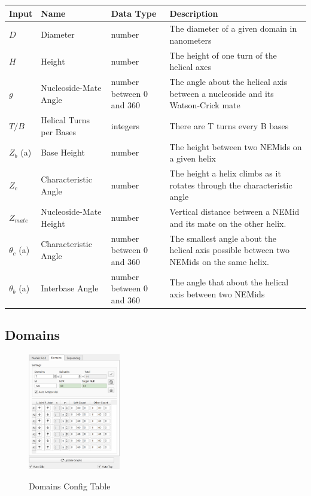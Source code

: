\documentclass[titlepage]{article}
\begin{document}
	\begin{tabular}{|p{.5in}|p{1in}|p{.7in}|p{1.5in}|}
		\label{tab:setting-descriptions}
		\centering
		Input & Name & Data Type & Description \\
		\hline
		$D$ & Diameter & number & The diameter of a given domain in nanometers \\ \hline
		$H$ & Height & number & The height of one turn of the helical axes \\ \hline
		$g$ & Nucleoside-Mate Angle & number between 0 and 360 & The angle about the helical axis between a nucleoside and its Watson-Crick mate \\ \hline
		$T/B$ & Helical Turns per Bases & integers & There are T turns every B bases \\ \hline
		$Z_b$ (a) & Base Height & number & The height between two NEMids on a given helix \\ \hline
		$Z_c$ & Characteristic Angle & number & The height a helix climbs as it rotates through the characteristic angle \\ \hline
		$Z_{mate}$ & Nucleoside-Mate Height & number & Vertical distance between a NEMid and its mate on the other helix. \\ \hline
		$\theta_{c}$ (a) & Characteristic Angle & number between 0 and 360 & The smallest angle about the helical axis possible between two NEMids on the same helix. \\ \hline
		$\theta_{b}$ (a) & Interbase Angle & number between 0 and 360 & The angle that about the helical axis between two NEMids \\
	\end{tabular}
	
	\subsection{Domains}
	
	\begin{figure}[h]
		\centering
		\caption{Domains Config Table}
		\includegraphics[height=2in]{domain-config-table.png}
		\label{fig:domain-config-table}
	\end{figure}
\end{document}
